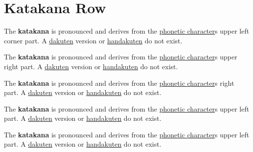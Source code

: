 \section{Katakana  Row}\label{sec:KatakanaNaRow}


\label{letter:na} The  \textbf{katakana}  is
pronounced  and  derives from the
\hyperref[sec:PhoneticCharacter]{phonetic character}s  upper
left corner part.  A \hyperref[sec:Dakuten]{dakuten} version  or
\hyperref[sec:Handakuten]{handakuten} do not exist.

\label{letter:ni} The  \textbf{katakana}  is
pronounced  and  derives from the
\hyperref[sec:PhoneticCharacter]{phonetic character}s  upper
right part.  A \hyperref[sec:Dakuten]{dakuten} version  or
\hyperref[sec:Handakuten]{handakuten} do not exist.

\label{letter:nu} The  \textbf{katakana}  is
pronounced  and  derives from the
\hyperref[sec:PhoneticCharacter]{phonetic character}s  right
part.  A \hyperref[sec:Dakuten]{dakuten} version  or
\hyperref[sec:Handakuten]{handakuten} do not exist.



\newpage

\label{letter:ne} The  \textbf{katakana}  is
pronounced  and  derives from the
\hyperref[sec:PhoneticCharacter]{phonetic character}s  upper
left  part.  A \hyperref[sec:Dakuten]{dakuten} version  or
\hyperref[sec:Handakuten]{handakuten} do not exist.

\label{letter:no} The  \textbf{katakana}  is
pronounced  and  derives from the
\hyperref[sec:PhoneticCharacter]{phonetic character}s  upper
left part.  A \hyperref[sec:Dakuten]{dakuten} version  or
\hyperref[sec:Handakuten]{handakuten} do not exist.


\newpage

\subsection{} \label{sec:KatakanaNa}


